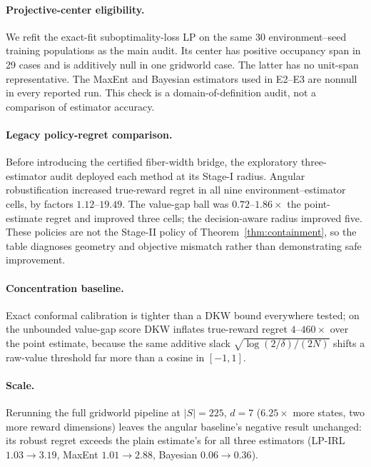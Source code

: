 \documentclass{article}
\begin{document}
\paragraph{Projective-center eligibility.} We refit the exact-fit
suboptimality-loss LP on the same 30 environment--seed training populations as
the main audit. Its center has positive occupancy span in 29 cases and is
additively null in one gridworld case. The latter has no unit-span representative.
The MaxEnt and Bayesian estimators used in E2--E3 are nonnull in every reported
run. This check is a domain-of-definition audit, not a comparison of estimator
accuracy.

\paragraph{Legacy policy-regret comparison.} Before introducing the certified
fiber-width bridge, the exploratory three-estimator audit deployed each method
at its Stage-I radius. Angular robustification increased true-reward regret in
all nine environment--estimator cells, by factors $1.12$--$19.49$. The
value-gap ball was $0.72$--$1.86\times$ the point-estimate regret and improved
three cells; the decision-aware radius improved five. These policies are not
the Stage-II policy of Theorem~\ref{thm:containment}, so the table diagnoses
geometry and objective mismatch rather than demonstrating safe improvement.

\paragraph{Concentration baseline.} Exact conformal calibration is tighter than
a DKW bound everywhere tested; on the unbounded value-gap score DKW inflates
true-reward regret $4$--$460\times$ over the point estimate, because the same
additive slack $\sqrt{\log(2/\delta)/(2N)}$ shifts a raw-value threshold far
more than a cosine in $[-1,1]$.

\paragraph{Scale.} Rerunning the full gridworld pipeline at $|S|=225$, $d=7$
($6.25\times$ more states, two more reward dimensions) leaves the angular
baseline's negative result unchanged: its robust regret exceeds the plain
estimate's for all three estimators (LP-IRL $1.03\to3.19$, MaxEnt
$1.01\to2.88$, Bayesian
$0.06\to0.36$).
\end{document}
